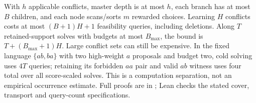 With $h$ applicable conflicts, master depth is at most $h$, each branch has at
most $B$ children, and each node scans/sorts $m$ rewarded choices. Learning $H$
conflicts costs at most $(B+1)H+1$ feasibility queries, including deletions.
Along $T$ retained-support solves with budgets at most $B_{\max}$, the bound is
$T+(B_{\max}+1)H$. Large conflict sets can still be expensive. In the fixed
language $\{ab,ba\}$ with two high-weight $a$ proposals and budget two, cold
solving uses $4T$ queries; retaining its forbidden $aa$ pair and valid $ab$
witness uses four total over all score-scaled solves. This is a computation
separation, not an empirical occurrence estimate. Full proofs are in
; Lean checks the stated cover,
transport and query-count specifications.

